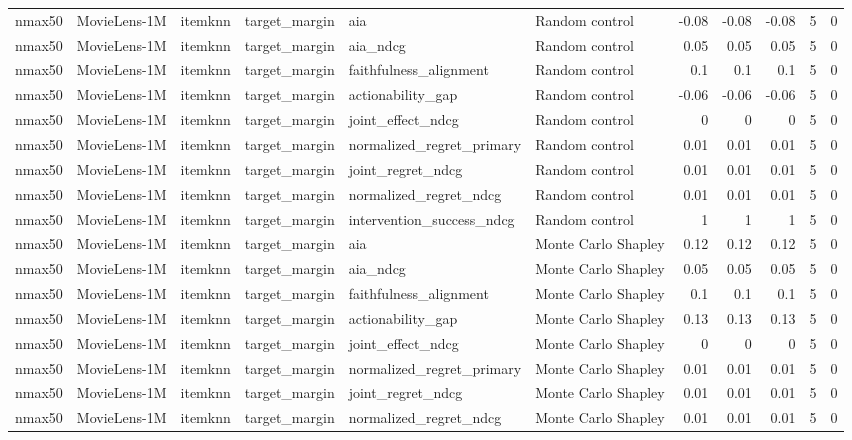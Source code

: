 \begin{table}[t]
{\begin{tabular}{llllllrrrrr}
nmax50 & MovieLens-1M & itemknn & target\_margin & aia & Random control & -0.08 & -0.08 & -0.08 & 5 & 0 \\
nmax50 & MovieLens-1M & itemknn & target\_margin & aia\_ndcg & Random control & 0.05 & 0.05 & 0.05 & 5 & 0 \\
nmax50 & MovieLens-1M & itemknn & target\_margin & faithfulness\_alignment & Random control & 0.1 & 0.1 & 0.1 & 5 & 0 \\
nmax50 & MovieLens-1M & itemknn & target\_margin & actionability\_gap & Random control & -0.06 & -0.06 & -0.06 & 5 & 0 \\
nmax50 & MovieLens-1M & itemknn & target\_margin & joint\_effect\_ndcg & Random control & 0 & 0 & 0 & 5 & 0 \\
nmax50 & MovieLens-1M & itemknn & target\_margin & normalized\_regret\_primary & Random control & 0.01 & 0.01 & 0.01 & 5 & 0 \\
nmax50 & MovieLens-1M & itemknn & target\_margin & joint\_regret\_ndcg & Random control & 0.01 & 0.01 & 0.01 & 5 & 0 \\
nmax50 & MovieLens-1M & itemknn & target\_margin & normalized\_regret\_ndcg & Random control & 0.01 & 0.01 & 0.01 & 5 & 0 \\
nmax50 & MovieLens-1M & itemknn & target\_margin & intervention\_success\_ndcg & Random control & 1 & 1 & 1 & 5 & 0 \\
nmax50 & MovieLens-1M & itemknn & target\_margin & aia & Monte Carlo Shapley & 0.12 & 0.12 & 0.12 & 5 & 0 \\
nmax50 & MovieLens-1M & itemknn & target\_margin & aia\_ndcg & Monte Carlo Shapley & 0.05 & 0.05 & 0.05 & 5 & 0 \\
nmax50 & MovieLens-1M & itemknn & target\_margin & faithfulness\_alignment & Monte Carlo Shapley & 0.1 & 0.1 & 0.1 & 5 & 0 \\
nmax50 & MovieLens-1M & itemknn & target\_margin & actionability\_gap & Monte Carlo Shapley & 0.13 & 0.13 & 0.13 & 5 & 0 \\
nmax50 & MovieLens-1M & itemknn & target\_margin & joint\_effect\_ndcg & Monte Carlo Shapley & 0 & 0 & 0 & 5 & 0 \\
nmax50 & MovieLens-1M & itemknn & target\_margin & normalized\_regret\_primary & Monte Carlo Shapley & 0.01 & 0.01 & 0.01 & 5 & 0 \\
nmax50 & MovieLens-1M & itemknn & target\_margin & joint\_regret\_ndcg & Monte Carlo Shapley & 0.01 & 0.01 & 0.01 & 5 & 0 \\
nmax50 & MovieLens-1M & itemknn & target\_margin & normalized\_regret\_ndcg & Monte Carlo Shapley & 0.01 & 0.01 & 0.01 & 5 & 0 \\

\end{tabular}}
\end{table}
